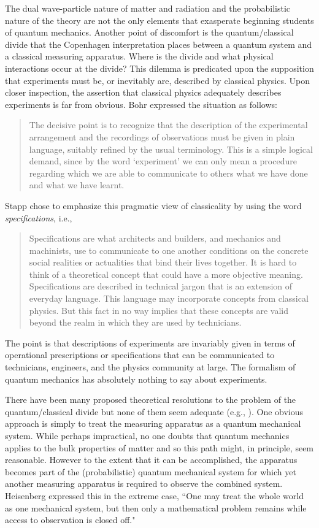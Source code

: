 \documentclass[12pt]{article}
\begin{document}
The dual wave-particle nature of matter and radiation and the probabilistic nature of the theory are not the only elements that exasperate beginning students of quantum mechanics.  Another point of discomfort is the quantum/classical divide that the Copenhagen interpretation places between a quantum system and a classical measuring apparatus.  Where is the divide and what physical interactions occur at the divide? This dilemma is predicated upon the supposition that experiments must be, or inevitably are, described by classical physics.  Upon closer inspection, the assertion that classical physics adequately describes experiments is far from obvious.  Bohr expressed the situation as follows\cite{Bo1958}:
\begin{quote}
The decisive point is to recognize that the description of the experimental arrangement and the recordings of observations must be given in plain language, suitably refined by the usual terminology. This is a simple logical demand, since by the word `experiment' we can only mean a procedure regarding which we are able to communicate to others what we have done and what we have learnt.
\end{quote}
Stapp\cite{St1972} chose to emphasize this pragmatic view of classicality by using the word {\it specifications}, i.e., 
\begin{quote}
Specifications are what architects and builders, and mechanics and machinists, use to communicate to one another conditions on the concrete social realities or actualities that bind their lives together. It is hard to think of a theoretical concept that could have a more objective meaning. Specifications are described in technical jargon that is an extension of everyday language. This language may incorporate concepts from classical physics. But this fact in no way implies that these concepts are valid beyond the realm in which they are used by technicians.
\end{quote}
The point is that descriptions of experiments are invariably given in terms of operational prescriptions or specifications that can be communicated to technicians, engineers, and the physics community at large.  The formalism of quantum mechanics has absolutely nothing to say about experiments.

There have been many proposed theoretical resolutions to the problem of the quantum/classical divide but none of them seem adequate (e.g., \cite{Bo2013}).  One obvious approach is simply to treat the measuring apparatus as a quantum mechanical system.  While perhaps impractical, no one doubts that quantum mechanics applies to the bulk properties of matter and so this path might, in principle, seem reasonable.  However to the extent that it can be accomplished, the apparatus becomes part of the (probabilistic) quantum mechanical system for which yet another measuring apparatus is required to observe the combined system.  Heisenberg expressed this in the extreme case, ``One may treat the whole world as one mechanical system, but then only a mathematical problem remains while access to observation is closed off."\cite{Sch2008}
\end{document}
